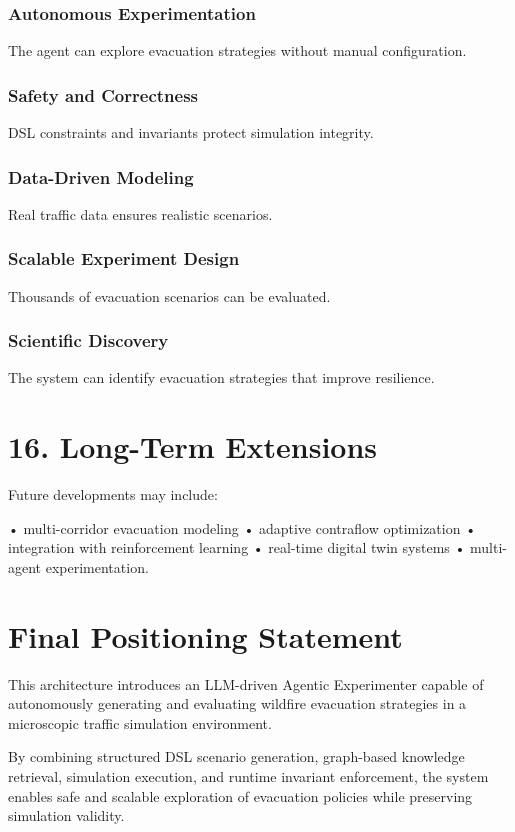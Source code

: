 \subsection*{Autonomous Experimentation}
The agent can explore evacuation strategies without manual configuration.

\subsection*{Safety and Correctness}
DSL constraints and invariants protect simulation integrity.

\subsection*{Data-Driven Modeling}
Real traffic data ensures realistic scenarios.

\subsection*{Scalable Experiment Design}
Thousands of evacuation scenarios can be evaluated.

\subsection*{Scientific Discovery}
The system can identify evacuation strategies that improve resilience.

\chapter*{16. Long-Term Extensions}
Future developments may include:

• multi-corridor evacuation modeling
• adaptive contraflow optimization
• integration with reinforcement learning
• real-time digital twin systems
• multi-agent experimentation.

\chapter*{Final Positioning Statement}
This architecture introduces an LLM-driven Agentic Experimenter capable of autonomously generating and evaluating wildfire evacuation strategies in a microscopic traffic simulation environment.

By combining structured DSL scenario generation, graph-based knowledge retrieval, simulation execution, and runtime invariant enforcement, the system enables safe and scalable exploration of evacuation policies while preserving simulation validity.

